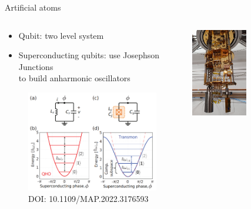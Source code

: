 \documentclass[aspectratio=169,10pt]{beamer}
\begin{document}
\begin{frame}[t,fragile]{Artificial atoms}
  \begin{columns}
    \begin{column}{0.6\textwidth}
      \centering
      \begin{itemize}
        \item Qubit: two level system
        \hspace{10 mm}
        \item Superconducting qubits: use Josephson Junctions\\ to build anharmonic oscillators
      \end{itemize}
      \begin{figure}
        \includegraphics[height=0.5\textheight]{figures/Transmon.png}
        \caption{DOI: 10.1109/MAP.2022.3176593}
      \end{figure}
    \end{column}
    \begin{column}{0.6\textwidth}
      \centering
      \includegraphics[width=0.5\textwidth]{figures/cryostat.png}
    \end{column}
  \end{columns}
\end{frame}
\end{document}
